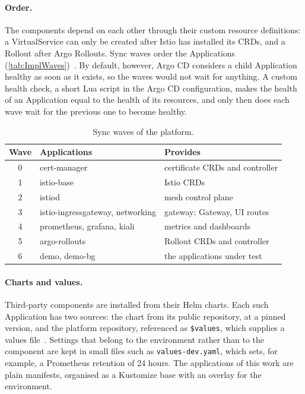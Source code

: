 \paragraph{Order.} The components depend on each other through their custom resource definitions: a VirtualService can only be created after Istio has installed its CRDs, and a Rollout after Argo Rollouts. Sync waves order the Applications (\autoref{tab:ImplWaves})~\cite{ArgoCDSyncWaves}. By default, however, Argo CD considers a child Application healthy as soon as it exists, so the waves would not wait for anything. A custom health check, a short Lua script in the Argo CD configuration, makes the health of an Application equal to the health of its resources, and only then does each wave wait for the previous one to become healthy.

\begin{table}[ht]
	\footnotesize
	\centering
	\begin{tabular}{ c p{4.6cm} p{6.8cm} }
		\toprule
		Wave & Applications & Provides \\
		\midrule
		0 & cert-manager & certificate CRDs and controller \\
		1 & istio-base & Istio CRDs \\
		2 & istiod & mesh control plane \\
		3 & istio-ingressgateway, networking & gateway; Gateway, UI routes \\
		4 & prometheus, grafana, kiali & metrics and dashboards \\
		5 & argo-rollouts & Rollout CRDs and controller \\
		6 & demo, demo-bg & the applications under test \\
		\bottomrule
	\end{tabular}
	\caption{Sync waves of the platform.}
	\label{tab:ImplWaves}
\end{table}

\paragraph{Charts and values.} Third-party components are installed from their Helm charts. Each such Application has two sources: the chart from its public repository, at a pinned version, and the platform repository, referenced as \texttt{\$values}, which supplies a values file~\cite{ArgoCDMultiSource}. Settings that belong to the environment rather than to the component are kept in small files such as \texttt{values-dev.yaml}, which sets, for example, a Prometheus retention of 24 hours. The applications of this work are plain manifests, organised as a Kustomize base with an overlay for the environment.

